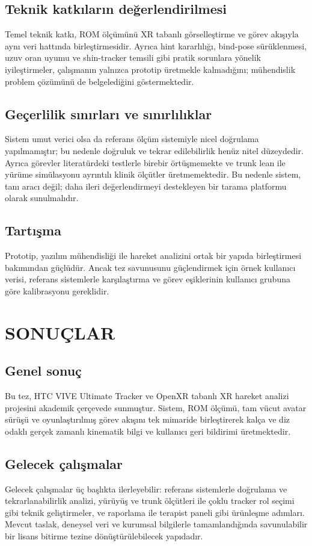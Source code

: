 \documentclass[12pt,a4paper,oneside]{report}
\begin{document}
\section{Teknik katkıların değerlendirilmesi}
Temel teknik katkı, ROM ölçümünü XR tabanlı görselleştirme ve görev akışıyla aynı veri hattında birleştirmesidir. Ayrıca hint kararlılığı, bind-pose sürüklenmesi, uzuv oran uyumu ve shin-tracker temsili gibi pratik sorunlara yönelik iyileştirmeler, çalışmanın yalnızca prototip üretmekle kalmadığını; mühendislik problem çözümünü de belgelediğini göstermektedir.

\section{Geçerlilik sınırları ve sınırlılıklar}
Sistem umut verici olsa da referans ölçüm sistemiyle nicel doğrulama yapılmamıştır; bu nedenle doğruluk ve tekrar edilebilirlik henüz nitel düzeydedir. Ayrıca görevler literatürdeki testlerle birebir örtüşmemekte ve trunk lean ile yürüme simülasyonu ayrıntılı klinik ölçütler üretmemektedir. Bu nedenle sistem, tanı aracı değil; daha ileri değerlendirmeyi destekleyen bir tarama platformu olarak sunulmalıdır.

\section{Tartışma}
Prototip, yazılım mühendisliği ile hareket analizini ortak bir yapıda birleştirmesi bakımından güçlüdür. Ancak tez savunusunu güçlendirmek için örnek kullanıcı verisi, referans sistemlerle karşılaştırma ve görev eşiklerinin kullanıcı grubuna göre kalibrasyonu gereklidir.

\chapter{SONUÇLAR}

\section{Genel sonuç}
Bu tez, HTC VIVE Ultimate Tracker ve OpenXR tabanlı XR hareket analizi projesini akademik çerçevede sunmuştur. Sistem, ROM ölçümü, tam vücut avatar sürüşü ve oyunlaştırılmış görev akışını tek mimaride birleştirerek kalça ve diz odaklı gerçek zamanlı kinematik bilgi ve kullanıcı geri bildirimi üretmektedir.

\section{Gelecek çalışmalar}
Gelecek çalışmalar üç başlıkta ilerleyebilir: referans sistemlerle doğrulama ve tekrarlanabilirlik analizi, yürüyüş ve trunk ölçütleri ile çoklu tracker rol seçimi gibi teknik geliştirmeler, ve raporlama ile terapist paneli gibi ürünleşme adımları. Mevcut taslak, deneysel veri ve kurumsal bilgilerle tamamlandığında savunulabilir bir lisans bitirme tezine dönüştürülebilecek yapıdadır.
\end{document}

